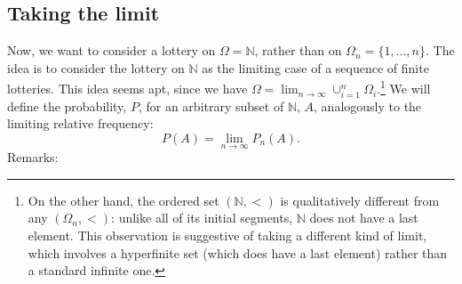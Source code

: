 \subsection{Taking the limit}
Now, we want to consider a lottery on $\Omega=\mathbb{N}$, rather than on $\Omega_n=\{1,\ldots,n\}$.
The idea is to consider the lottery on $\mathbb{N}$ as the limiting case of a sequence of finite lotteries.
This idea seems apt, since we have $\Omega= \lim_{n\rightarrow\infty} \cup_{i=1}^{n} \Omega_i$.\footnote{On the other hand, the ordered set $(\mathbb{N},<)$ is qualitatively different from any $(\Omega_n,<)$: unlike all of its initial segments, $\mathbb{N}$ does not have a last element. This observation is suggestive of taking a different kind of limit, which involves a hyperfinite set (which does have a last element) rather than a standard infinite one.}
We will define the probability, $P$, for an arbitrary subset of $\mathbb{N}$, $A$, analogously to the limiting relative frequency:
$$ P(A)= \lim_{n\rightarrow\infty} P_n(A). $$
Remarks:
